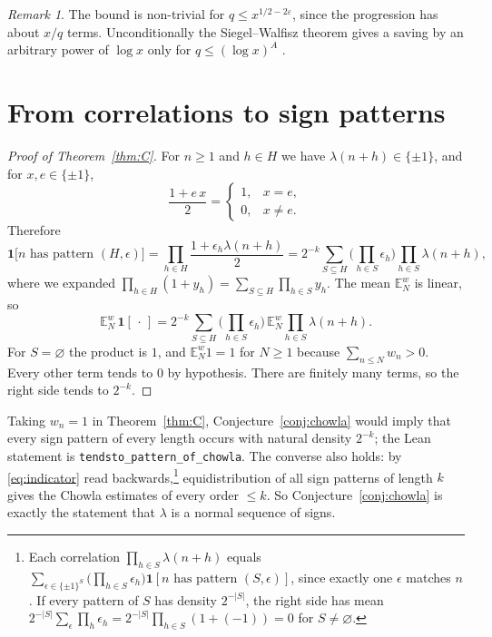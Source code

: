 \documentclass[11pt]{amsart}
\numberwithin{equation}{section}
\theoremstyle{plain}
\theoremstyle{definition}
\theoremstyle{remark}
\newtheorem{rem}[thm]{Remark}
\newcommand{\E}{\mathbb{E}}
\newcommand{\lean}[1]{\texttt{#1}}
\begin{document}
\begin{rem}
The bound is non-trivial for $q\le x^{1/2-2\varepsilon}$, since the progression has about $x/q$ terms. Unconditionally the Siegel--Walfisz theorem gives a saving by an arbitrary power of $\log x$ only for $q\le(\log x)^A$ \cite[Chapter~11]{MV07}.
\end{rem}

\section{From correlations to sign patterns}\label{sec:patterns}

\begin{proof}[Proof of Theorem~\ref{thm:C}]
For $n\ge1$ and $h\in H$ we have $\lambda(n+h)\in\{\pm1\}$, and for $x,e\in\{\pm1\}$,
\[
\frac{1+e\,x}{2}=\begin{cases}1,& x=e,\\0,&x\ne e.\end{cases}
\]
Therefore
\begin{equation}\label{eq:indicator}
\mathbf 1\big[n\text{ has pattern }(H,\epsilon)\big]=\prod_{h\in H}\frac{1+\epsilon_h\lambda(n+h)}{2}
=2^{-k}\sum_{S\subseteq H}\Big(\prod_{h\in S}\epsilon_h\Big)\prod_{h\in S}\lambda(n+h),
\end{equation}
where we expanded $\prod_{h\in H}(1+y_h)=\sum_{S\subseteq H}\prod_{h\in S}y_h$. The mean $\E^w_N$ is linear, so
\[
\E^w_N\,\mathbf 1[\,\cdot\,]=2^{-k}\sum_{S\subseteq H}\Big(\prod_{h\in S}\epsilon_h\Big)\,\E^w_N\prod_{h\in S}\lambda(n+h).
\]
For $S=\varnothing$ the product is $1$, and $\E^w_N 1=1$ for $N\ge1$ because $\sum_{n\le N}w_n>0$. Every other term tends to $0$ by hypothesis. There are finitely many terms, so the right side tends to $2^{-k}$.
\end{proof}

Taking $w_n=1$ in Theorem~\ref{thm:C}, Conjecture~\ref{conj:chowla} would imply that every sign pattern of every length occurs with natural density $2^{-k}$; the Lean statement is \lean{tendsto\_pattern\_of\_chowla}. The converse also holds: by \eqref{eq:indicator} read backwards,\footnote{Each correlation $\prod_{h\in S}\lambda(n+h)$ equals $\sum_{\epsilon\in\{\pm1\}^S}\big(\prod_{h\in S}\epsilon_h\big)\mathbf 1[n\text{ has pattern }(S,\epsilon)]$, since exactly one $\epsilon$ matches $n$. If every pattern of $S$ has density $2^{-|S|}$, the right side has mean $2^{-|S|}\sum_\epsilon\prod_h\epsilon_h=2^{-|S|}\prod_{h\in S}(1+(-1))=0$ for $S\ne\varnothing$.} equidistribution of all sign patterns of length $k$ gives the Chowla estimates of every order $\le k$. So Conjecture~\ref{conj:chowla} is exactly the statement that $\lambda$ is a normal sequence of signs.
\end{document}
